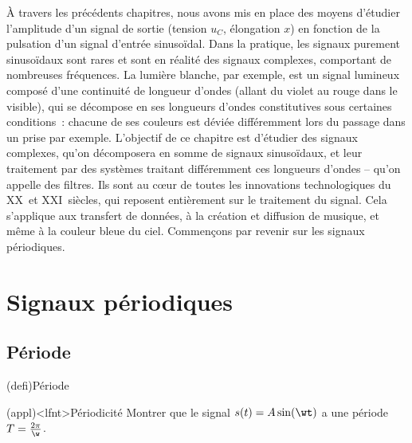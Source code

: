 \documentclass[../../main/main.tex]{subfiles}
\begin{document}
\vfill

\newpage

\vspace*{\fill}
\minitoc
\vspace*{\fill}

À travers les précédents chapitres, nous avons mis en place des moyens d'étudier
l'amplitude d'un signal de sortie (tension $u_C$, élongation $x$) en fonction de
la pulsation d'un signal d'entrée sinusoïdal. Dans la pratique, les signaux
purement sinusoïdaux sont rares et sont en réalité des signaux complexes,
comportant de nombreuses fréquences. La lumière blanche, par exemple, est un
signal lumineux composé d'une continuité de longueur d'ondes (allant du violet
au rouge dans le visible), qui se décompose en ses longueurs d'ondes
constitutives sous certaines conditions~: chacune de ses couleurs est déviée
différemment lors du passage dans un prise par exemple.
\bigbreak
L'objectif de ce chapitre est d'étudier des signaux complexes, qu'on décomposera
en somme de signaux sinusoïdaux, et leur traitement par des systèmes traitant
différemment ces longueurs d'ondes -- qu'on appelle des filtres. Ils sont au
cœur de toutes les innovations technologiques du \textsc{XX}\ieme\ et
\textsc{XXI}\ieme\ siècles, qui reposent entièrement sur le traitement du
signal. Cela s'applique aux transfert de données, à la création et diffusion de
musique, et même à la couleur bleue du ciel. Commençons par revenir sur les
signaux périodiques.

\vspace*{\fill}

\newpage

\section{Signaux périodiques}
\subsection{Période}
\begin{tcb*}(defi){Période}
	\psw{
		\[
			s(t) \quad \text{périodique}
			\Lra
			\exists T~: \forall t \in \Rb^{+}, s(t+T) = s(t)
		\]
	}
	\vspace{-15pt}
\end{tcb*}
\begin{tcb*}(appl)<lfnt>{Périodicité}
	Montrer que le signal $s(t) = A \sin(\wt)$ a une période $T =
		\frac{2\pi}{\w}$.
	\tcblower
	\psw{
		\[
			s \left( t + \frac{2\pi}{\w} \right) =
			A \left( \w \left( t + \frac{2\pi}{\w} \right) \right) =
			A \sin(\wt + 2\pi) = A \sin(\wt)
			\qed
		\]
	}
	\vspace{-15pt}
\end{tcb*}
\end{document}
